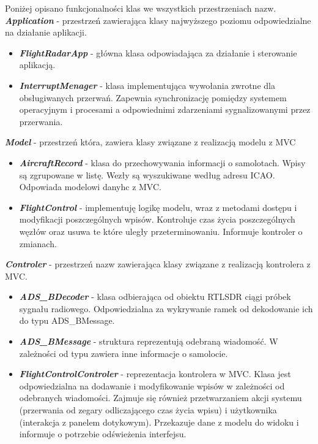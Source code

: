 \documentclass[eng,printmode]{mgr}
\begin{document}
\noindent
Poniżej opisano funkcjonalności klas we wszystkich przestrzeniach nazw.
\\


\noindent
\textbf{\textit{Application}} - przestrzeń zawierająca klasy najwyższego poziomu odpowiedzialne na działanie aplikacji.
\begin{itemize}[label={}]
  \item \textbf{\textit{FlightRadarApp}} - główna klasa odpowiadająca za działanie i sterowanie aplikacją.
  \item \textbf{\textit{InterruptMenager}} - klasa implementująca wywołania zwrotne dla obsługiwanych przerwań. Zapewnia synchronizację pomiędzy systemem operacyjnym i procesami a odpowiednimi zdarzeniami sygnalizowanymi przez przerwania.
\end{itemize}
\vskip 0.55cm

\noindent
\textbf{\textit{Model}} - przestrzeń która, zawiera klasy związane z realizacją modelu z MVC
\begin{itemize}[label={}]
  \item \textbf{\textit{AircraftRecord}} - klasa do przechowywania informacji o samolotach. Wpisy są zgrupowane w listę. Wezły są wyszukiwane według adresu ICAO. Odpowiada modelowi danyhc z MVC.
  \item \textbf{\textit{FlightControl}} - implementuję logikę modelu, wraz z metodami dostępu i modyfikacji poszczególnych wpisów. Kontroluje czas życia poszczególnych węzłów oraz usuwa te które uległy przeterminowaniu. Informuje kontroler o zmianach.
\end{itemize}
\vskip 0.55cm

\noindent
\textbf{\textit{Controler}} - przestrzeń nazw zawierająca klasy związane z realizacją kontrolera z MVC.
\begin{itemize}[label={}]
  \item \textbf{\textit{ADS\_BDecoder}} - klasa odbierająca od obiektu RTLSDR ciągi próbek sygnału radiowego. Odpowiedzialna za wykrywanie ramek od dekodowanie ich do typu ADS\_BMessage.
  \item \textbf{\textit{ADS\_BMessage}} - struktura reprezentują odebraną wiadomość. W zależności od typu zawiera inne informacje o samolocie.
  \item \textbf{\textit{FlightControlControler}} - reprezentacja kontrolera w MVC. Klasa jest odpowiedzialna na dodawanie i modyfikowanie wpisów w zależności od odebranych wiadomości. Zajmuje się również przetwarzaniem akcji systemu (przerwania od zegary odliczającego czas życia wpisu) i użytkownika (interakcja z panelem dotykowym). Przekazuje dane z modelu do widoku i informuje o potrzebie odświeżenia interfejsu.
\end{itemize}
\vskip 0.55cm
\end{document}
